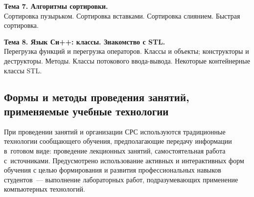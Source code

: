\documentclass[a4paper,12pt]{article}
\begin{document}
\textbf{Тема 7. Алгоритмы сортировки.	                     }\\
Сортировка пузырьком. Сортировка вставками. Сортировка слиянием. Быстрая сортировка.

\textbf{Тема 8. Язык Си++: классы. Знакомство с STL.         }\\
Перегрузка функций и перегрузка операторов. Классы и объекты; конструкторы и деструкторы. Методы. Классы потокового ввода-вывода. Некоторые контейнерные классы STL.
 

\subsection{Формы и методы проведения занятий, применяемые учебные технологии}
При проведении занятий и организации СРС используются традиционные технологии сообщающего обучения, предполагающие передачу информации в~готовом виде: проведение лекционных занятий, самостоятельная работа с~источниками. Предусмотрено использование активных и интерактивных форм обучения с целью формирования и развития профессиональных навыков студентов~--- выполнение лабораторных работ, подразумевающих применение компьютерных технологий. 
\end{document}
